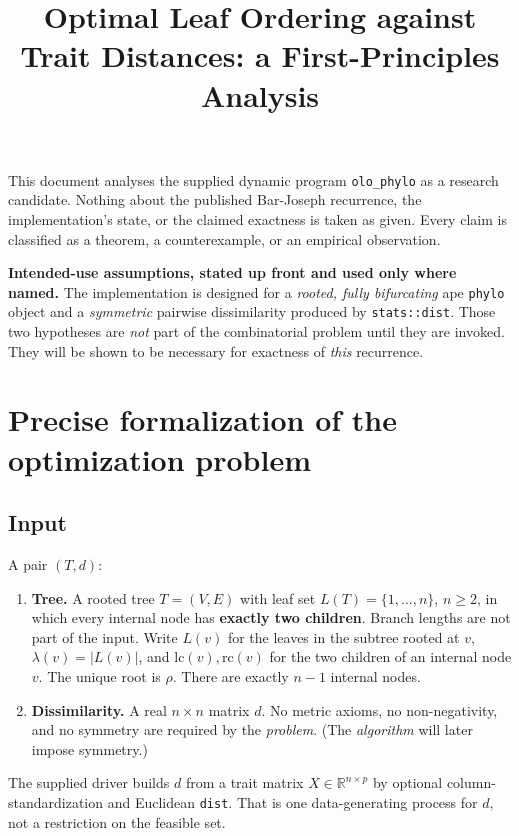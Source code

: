 \documentclass[11pt]{article}
\title{Optimal Leaf Ordering against Trait Distances: a First-Principles Analysis}
\author{}
\date{}
\theoremstyle{plain}
\newcommand{\lc}{\mathrm{lc}}
\newcommand{\rc}{\mathrm{rc}}
\newcommand{\R}{\mathbb{R}}
\begin{document}
\maketitle

This document analyses the supplied dynamic program \texttt{olo\_phylo} as a
research candidate. Nothing about the published Bar-Joseph recurrence, the
implementation's state, or the claimed exactness is taken as given. Every claim
is classified as a theorem, a counterexample, or an empirical observation.

\textbf{Intended-use assumptions, stated up front and used only where named.}
The implementation is designed for a \emph{rooted, fully bifurcating} ape
\texttt{phylo} object and a \emph{symmetric} pairwise dissimilarity produced by
\texttt{stats::dist}. Those two hypotheses are \emph{not} part of the
combinatorial problem until they are invoked. They will be shown to be
necessary for exactness of \emph{this} recurrence.

\section{Precise formalization of the optimization problem}

\subsection{Input}

A pair \((T, d)\):

\begin{enumerate}[label=\arabic*.]
\item \textbf{Tree.} A rooted tree \(T = (V, E)\) with leaf set
  \(L(T) = \{1, \dots, n\}\), \(n \ge 2\), in which every internal node has
  \textbf{exactly two children}. Branch lengths are not part of the input.
  Write \(L(v)\) for the leaves in the subtree rooted at \(v\),
  \(\lambda(v) = |L(v)|\), and \(\lc(v),\rc(v)\) for the two children of an
  internal node \(v\). The unique root is \(\rho\). There are exactly \(n-1\)
  internal nodes.
\item \textbf{Dissimilarity.} A real \(n \times n\) matrix \(d\). No metric
  axioms, no non-negativity, and no symmetry are required by the
  \emph{problem}. (The \emph{algorithm} will later impose symmetry.)
\end{enumerate}

The supplied driver builds \(d\) from a trait matrix
\(X \in \R^{n \times p}\) by optional column-standardization and Euclidean
\texttt{dist}. That is one data-generating process for \(d\), not a restriction
on the feasible set.
\end{document}
